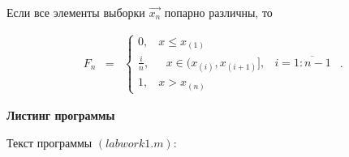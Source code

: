 \documentclass[12pt,a4paper]{scrartcl}
\begin{document}
Если все элементы выборки $\overrightarrow {x_n}$ попарно различны, то

\begin{equation}\label{eq1.12}
\begin{matrix}
F_n & =
& \left\{
\begin{matrix}
0, &x \leq x_{(1)} \\
\frac {i} {n}, & \mbox{ } x \in (x_{(i)}, x_{(i+1)}], & i = \overline {1: n - 1} \\
1, & x  > x_{(n)}
\end{matrix} \right.
\end{matrix} .
\end{equation}

\newpage
{}
\begin{center}
\textbf {Листинг программы}
\end{center}

Текст программы $(labwork1.m)$:
\end{document}
